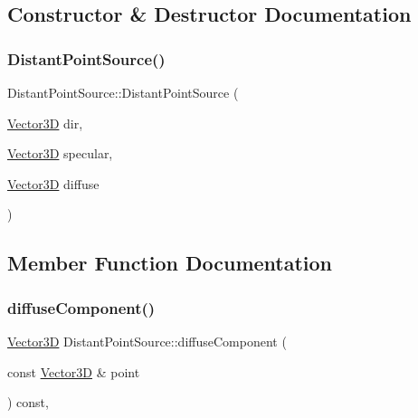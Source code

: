 \subsection{Constructor \& Destructor Documentation}
\mbox{\label{classDistantPointSource_abb36a1b1376c1d895e11ba5a01466a0b}} 
\subsubsection{\texorpdfstring{DistantPointSource()}{DistantPointSource()}}
{\footnotesize\ttfamily Distant\+Point\+Source\+::\+Distant\+Point\+Source (\begin{DoxyParamCaption}\item[{\mbox{\hyperlink{classVector3D}{Vector3D}}}]{dir,  }\item[{\mbox{\hyperlink{classVector3D}{Vector3D}}}]{specular,  }\item[{\mbox{\hyperlink{classVector3D}{Vector3D}}}]{diffuse }\end{DoxyParamCaption})}



\subsection{Member Function Documentation}
\mbox{\label{classDistantPointSource_ae3682ba2e553f38d6c9e4ee1bed9504f}} 
\subsubsection{\texorpdfstring{diffuseComponent()}{diffuseComponent()}}
{\footnotesize\ttfamily \mbox{\hyperlink{classVector3D}{Vector3D}} Distant\+Point\+Source\+::diffuse\+Component (\begin{DoxyParamCaption}\item[{const \mbox{\hyperlink{classVector3D}{Vector3D}} \&}]{point }\end{DoxyParamCaption}) const\hspace{0.3cm}{\ttfamily [override]}, {\ttfamily [virtual]}}



